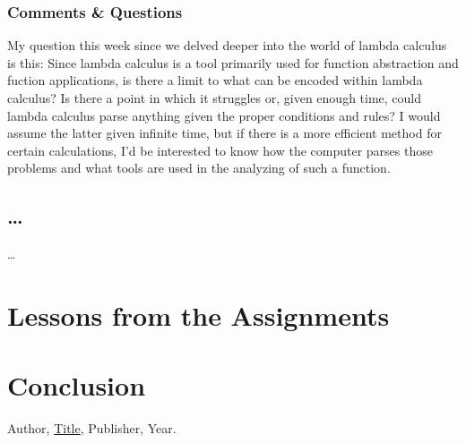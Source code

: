 \documentclass{article}
\theoremstyle{theorem}
\theoremstyle{definition}
\theoremstyle{remark}
\begin{document}
\subsubsection*{Comments \& Questions}

My question this week since we delved deeper into the world of lambda calculus is this: Since lambda calculus is a tool primarily used for function abstraction and fuction applications, is there a limit to what can be encoded within lambda calculus? Is there a point in which it struggles or, given enough time, could lambda calculus parse anything given the proper conditions and rules? I would assume the latter given infinite time, but if there is a more efficient method for certain calculations, I'd be interested to know how the computer parses those problems and what tools are used in the analyzing of such a function.

\subsection{\ldots} 

\ldots

\section{Lessons from the Assignments}





\section{Conclusion}\label{conclusion}


\begin{thebibliography}{99}
 Author, \href{https://en.wikipedia.org/wiki/LaTeX}{Title}, Publisher, Year.
\end{thebibliography}
\end{document}
